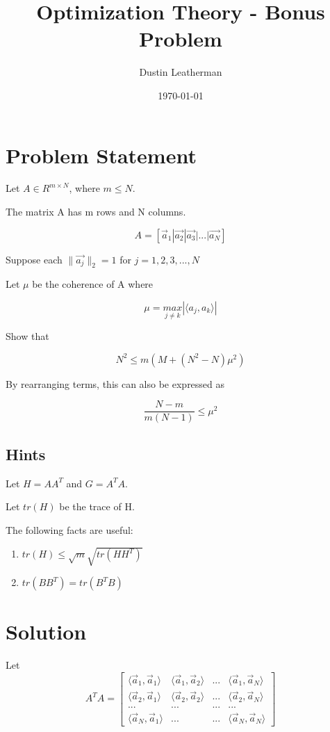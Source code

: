 \documentclass[11pt]{article}
\author{Dustin Leatherman}
\date{\today}
\title{Optimization Theory - Bonus Problem}
\begin{document}
\maketitle
\tableofcontents


\section{Problem Statement}
\label{sec:org8628d76}

Let \(A \in R ^{m \times N}\), where \(m \leq N\).

The matrix A has m rows and N columns.

$$A = [\vec a_1 | \vec{a_2} | \vec{a_3} | ... | \vec{a_N}]$$


Suppose each \(\| \vec{a_j} \|_2 = 1\) for \(j = 1, 2, 3, ..., N\)

Let \(\mu\) be the coherence of A where

$$\mu = \underset{j \neq k}{max}| \langle a_j, a_k \rangle|$$

Show that

$$N^2 \leq m(M + (N^2 - N) \mu^2)$$

By rearranging terms, this can also be expressed as

$$\frac{N - m}{m(N - 1)} \leq \mu^2$$
\subsection{Hints}
\label{sec:org75e06b7}

Let \(H = AA^T\) and \(G = A^T A\).

Let \(tr(H)\) be the trace of H.

The following facts are useful:
\begin{enumerate}
\item \(tr(H) \leq \sqrt m \sqrt{tr(HH^T)}\)
\item \(tr(BB^T) = tr(B^T B)\)
\end{enumerate}

\section{Solution}
\label{sec:orgfe9f57f}

Let $$A^T A = \begin{bmatrix}
\langle \vec a_1, \vec a_1 \rangle & \langle \vec a_1, \vec a_2 \rangle & ... &
\langle \vec a_1, \vec a_N \rangle\\
\langle \vec a_2, \vec a_1 \rangle & \langle \vec a_2, \vec a_2 \rangle & ... &
\langle \vec a_2, \vec a_N \rangle\\
... & ... & ... & ... \\
\langle \vec a_N, \vec a_1 \rangle & ... & ... & \langle \vec a_N, \vec a_N \rangle
\end{bmatrix}
$$
\end{document}
